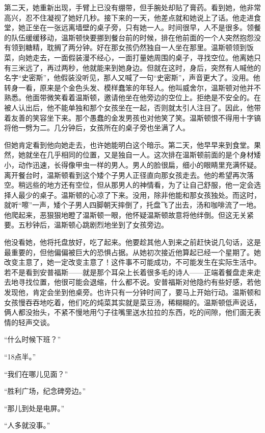 第二天，她重新出现，手臂上已没有绷带，但手腕处却贴了膏药。看到她，他非常高兴，忍不住凝视了她好几秒。接下来的一天，他差点就和她说上了话。他走进食堂，她正坐在一张远离墙壁的桌子旁，只有她一人。时间很早，人不是很多。领餐的队伍缓缓移动，温斯顿快要挪到餐台前的时候，排在他前面的一个人突然抱怨没有领到糖精，耽搁了两分钟。好在那女孩仍然独自一人坐在那里。温斯顿领到饭菜，向她走去，一面假装漫不经心，一面打量她周围的桌子，寻找空位。他离她只有三米远了，再过两秒，他就能来到她身边。但就在这时，身后，突然有人喊他的名字``史密斯''，他假装没听见，那人又喊了一句``史密斯''，声音更大了。没用。他转身一看，原来是个金色头发、模样蠢笨的年轻人。他叫威舍尔，温斯顿对他并不熟悉。他面带微笑看着温斯顿，邀请他坐在他旁边的空位上。拒绝是不安全的。在被人认出后，他不能单独和那个女孩坐在一起，否则就太引人注目了。因此，他带着友善的笑容坐下来。那个愚蠢的金发男孩也对他笑了笑。温斯顿恨不得用十字镐将他一劈为二。几分钟后，女孩所在的桌子旁也坐满了人。

但她肯定看到他向她走去，也许她能明白这个暗示。第二天，他早早来到食堂。果然，她就坐在几乎相同的位置，又是独自一人。这次排在温斯顿前面的是个身材矮小，动作迅速，长得像甲虫一样的男人。男人的脸很扁，细小的眼睛里充满怀疑。离开餐台时，温斯顿看到这个矮个子男人正径直向那女孩走去。他的希望再次落空。稍远些的地方还有空位，但从那男人的神情看，为了让自己舒服，他一定会选择人最少的桌子。温斯顿的心凉了下来。没用，除非他能和那女孩独处。而这时，就听``嚓''一声，矮个子男人四脚朝天摔倒了，托盘飞了出去，汤和咖啡流了一地。他爬起来，恶狠狠地瞪了温斯顿一眼，他怀疑温斯顿故意将他绊倒。但这无关紧要。五秒钟后，温斯顿心跳剧烈地坐到了女孩旁边。

他没看她，他将托盘放好，吃了起来。他要趁其他人到来之前赶快说几句话，这是最重要的，但他偏偏被巨大的恐惧占据。从她初次接近他算起已经一个星期了。她改变主意了，她一定改变主意了！这件事不可能成功，不可能发生在实际生活中。若不是看到安普福斯——就是那个耳朵上长着很多毛的诗人——正端着餐盘走来走去地寻找位置，他很可能会退缩，什么都不说。安普福斯对他隐约有些好感，若他发现他，肯定会坐到他桌旁。也许只有一分钟时间了，要马上开始行动。温斯顿和女孩慢吞吞地吃着，他们吃的炖菜其实就是菜豆汤，稀糊糊的。温斯顿低声说话，俩人都没抬头，不紧不慢地用勺子往嘴里送水拉拉的东西，吃的间隙，他们面无表情的轻声交谈。

``什么时候下班？''

``18点半。''

``我们在哪儿见面？''

``胜利广场，纪念碑旁边。''

``那儿到处是电屏。''

``人多就没事。''


